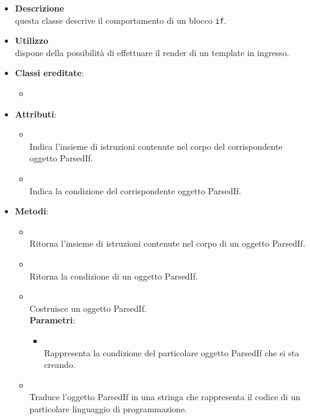 \begin{itemize}
\item \textbf{Descrizione}\\
questa classe descrive il comportamento di un blocco \texttt{if}.
\item \textbf{Utilizzo}\\
dispone della possibilità di effettuare il render di un template in ingresso.
\item \textbf{Classi ereditate}:
\begin{itemize}
\item \hyperref[\nogloxy{swedesigner::server::project::ParsedInstruction}]{}
\end{itemize}
\item \textbf{Attributi}:
\begin{itemize}
\item {}
\\ Indica l'insieme di istruzioni contenute nel corpo del corrispondente oggetto ParsedIf.
\item {}
\\ Indica la condizione del corrispondente oggetto ParsedIf.
\end{itemize}
\item \textbf{Metodi}:
\begin{itemize}
\item {}
\\ Ritorna l'insieme di istruzioni contenute nel corpo di un oggetto ParsedIf.
\item {}
\\ Ritorna la condizione di un oggetto ParsedIf.
\item {}
\\ Costruisce un oggetto ParsedIf.
\\ \textbf{Parametri}:
\begin{itemize}
\item {}
\\ Rappresenta la condizione del particolare oggetto ParsedIf che si sta creando.
\end{itemize}
\item {}
\\ Traduce l'oggetto ParsedIf in una stringa che rappresenta il codice di un particolare linguaggio di programmazione.

\end{itemize}
\end{itemize}
